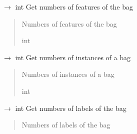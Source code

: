 \documentclass[letterpaper,10pt,english]{sphinxmanual}
\begin{document}
\begin{fulllineitems}
\begin{fulllineitems}
\label{\detokenize{data/_autosummary/miml.data.bag.Bag:miml.data.bag.Bag.get_number_features}}
\pysigstartsignatures
\pysiglinewithargsret
{}
{}
{{ $\rightarrow$ int}}
\pysigstopsignatures
\sphinxAtStartPar
Get numbers of features of the bag
\begin{quote}\begin{description}
\sphinxAtStartPar
{} \textendash{} Numbers of features of the bag

\sphinxAtStartPar
int

\end{description}\end{quote}

\end{fulllineitems}


\begin{fulllineitems}
\label{\detokenize{data/_autosummary/miml.data.bag.Bag:miml.data.bag.Bag.get_number_instances}}
\pysigstartsignatures
\pysiglinewithargsret
{}
{}
{{ $\rightarrow$ int}}
\pysigstopsignatures
\sphinxAtStartPar
Get numbers of instances of a bag
\begin{quote}\begin{description}
\sphinxAtStartPar
{} \textendash{} Numbers of instances of a bag

\sphinxAtStartPar
int

\end{description}\end{quote}

\end{fulllineitems}


\begin{fulllineitems}
\label{\detokenize{data/_autosummary/miml.data.bag.Bag:miml.data.bag.Bag.get_number_labels}}
\pysigstartsignatures
\pysiglinewithargsret
{}
{}
{{ $\rightarrow$ int}}
\pysigstopsignatures
\sphinxAtStartPar
Get numbers of labels of the bag
\begin{quote}\begin{description}
\sphinxAtStartPar
{} \textendash{} Numbers of labels of the bag


\end{description}
\end{quote}
\end{fulllineitems}
\end{fulllineitems}
\end{document}
